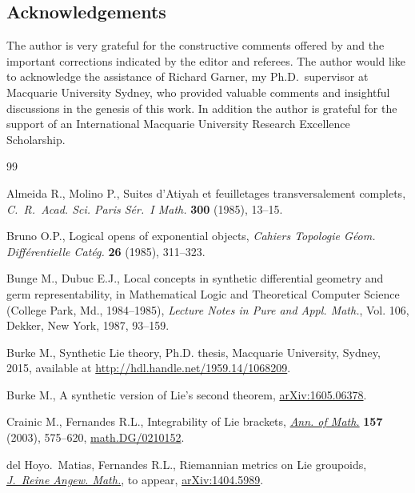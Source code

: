 \documentclass[10pt,a4paper]{amsart}
\numberwithin{equation}{section}
\begin{document}
\subsection*{Acknowledgements}

The author is very grateful for the constructive comments of\/fered by and the important corrections indicated by the editor and referees. The author would like to acknowledge the assistance of Richard Garner, my Ph.D.\ supervisor at Macquarie University Sydney, who provided valuable comments and insightful discussions in the genesis of this work. In addition the author is grateful for the support of an International Macquarie University Research Excellence Scholarship.


\begin{thebibliography}{99}
\footnotesize\itemsep=0pt

Almeida R., Molino P., Suites d'{A}tiyah et feuilletages transversalement
 complets, \textit{C.~R.~Acad. Sci. Paris S\'er.~I Math.} \textbf{300} (1985),
 13--15.

Bruno O.P., Logical opens of exponential objects, \textit{Cahiers Topologie
 G\'eom. Diff\'erentielle Cat\'eg.} \textbf{26} (1985), 311--323.

Bunge M., Dubuc E.J., Local concepts in synthetic dif\/ferential geometry and
 germ representability, in Mathematical Logic and Theoretical Computer Science
 ({C}ollege {P}ark, {M}d., 1984--1985), \textit{Lecture Notes in Pure and
 Appl. Math.}, Vol. 106, Dekker, New York, 1987, 93--159.

Burke M., Synthetic {L}ie theory, Ph.D. thesis, Macquarie University, Sydney,
 2015, {a}vailable at \url{http://hdl.handle.net/1959.14/1068209}.

Burke M., A synthetic version of {L}ie's second theorem, \href{http://arxiv.org/abs/1605.06378}{arXiv:1605.06378}.

Crainic M., Fernandes R.L., Integrability of {L}ie brackets, \href{https://doi.org/10.4007/annals.2003.157.575}{\textit{Ann. of
 Math.}} \textbf{157} (2003), 575--620, \href{http://arxiv.org/abs/math.DG/0210152}{math.DG/0210152}.

del Hoyo.~Matias, Fernandes R.L., Riemannian metrics on {L}ie groupoids,
 \href{https://doi.org/10.1515/crelle-2015-0018}{\textit{J.~Reine Angew. Math.}}, {t}o appear, \href{http://arxiv.org/abs/1404.5989}{arXiv:1404.5989}.


\end{thebibliography}
\end{document}
